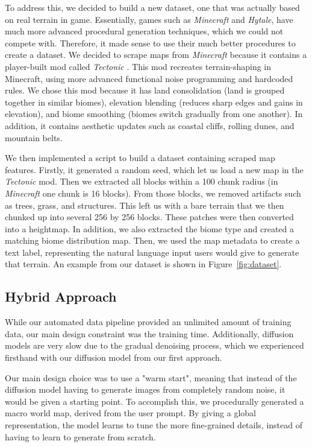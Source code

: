 \documentclass[conference]{IEEEtran}
\begin{document}
To address this, we decided to build a new dataset, one that was actually based on real terrain in game. Essentially, games such as \textit{Minecraft} and \textit{Hytale}, have much more advanced procedural generation techniques, which we could not compete with. Therefore, it made sense to use their much better procedures to create a dataset. We decided to scrape maps from \textit{Minecraft} because it contains a player-built mod called \textit{Tectonic} \cite{tectonic_curseforge_2026}. This mod recreates terrain-shaping in Minecraft, using more advanced functional noise programming and hardcoded rules. We chose this mod because it has land consolidation (land is grouped together in similar biomes), elevation blending (reduces sharp edges and gains in elevation), and biome smoothing (biomes switch gradually from one another). In addition, it contains aesthetic updates such as coastal cliffs, rolling dunes, and mountain belts. 

We then implemented a script to build a dataset containing scraped map features. Firstly, it generated a random seed, which let us load a new map in the \textit{Tectonic} mod. Then we extracted all blocks within a 100 chunk radius (in \textit{Minecraft} one chunk is 16 blocks). From those blocks, we removed artifacts such as trees, grass, and structures. This left us with a bare terrain that we then chunked up into several 256 by 256 blocks. These patches were then converted into a heightmap. In addition, we also extracted the biome type and created a matching biome distribution map. Then, we used the map metadata to create a text label, representing the natural language input users would give to generate that terrain. An example from our dataset is shown in Figure~\ref{fig:dataset}.

\subsection{Hybrid Approach}
While our automated data pipeline provided an unlimited amount of training data, our main design constraint was the training time. Additionally, diffusion models are very slow due to the gradual denoising process, which we experienced firsthand with our diffusion model from our first approach.

Our main design choice was to use a "warm start", meaning that instead of the diffusion model having to generate images from completely random noise, it would be given a starting point. To accomplish this, we procedurally generated a macro world map, derived from the user prompt. By giving a global representation, the model learns to tune the more fine-grained details, instead of having to learn to generate from scratch.
\end{document}
